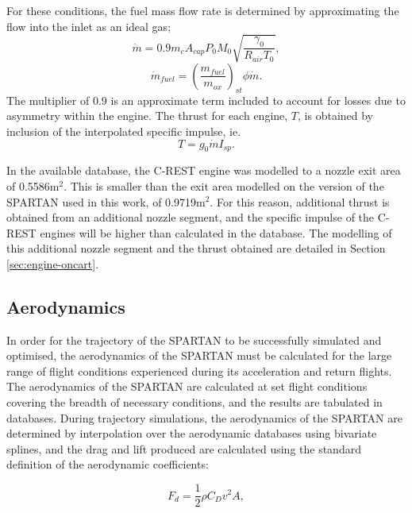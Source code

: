 For these conditions, the fuel mass flow rate is determined by approximating the flow into the inlet as an ideal gas; 
\begin{equation}
\dot{m} = 0.9 m_c A_{cap} P_0 M_0 \sqrt{\dfrac{\gamma_0}{R_{air} T_0}},
\end{equation}
\begin{equation}
\dot{m}_{fuel} = (\dfrac{m_{fuel}}{m_{ox}} )_{st} \phi \dot{m}.
\end{equation}
The multiplier of 0.9 is an approximate term included to account for losses due to asymmetry within the engine\cite{Preller2018a}. 
The thrust for each engine, $T$, is obtained by inclusion of the interpolated specific impulse, ie. 
\begin{equation}
T = g_0\dot{m}I_{sp}. 
\end{equation}

In the available database, the C-REST engine was modelled to a nozzle exit area of 0.5586m$^2$. This is smaller than the exit area modelled on the version of the SPARTAN used in this work, of 0.9719m$^2$. For this reason, additional thrust is obtained from an additional nozzle segment, and the specific impulse of the C-REST engines will be higher than calculated in the database. The modelling of this additional nozzle segment and the thrust obtained are detailed in Section \ref{sec:engine-oncart}.






		
		
		\subsection{Aerodynamics}\label{sec:aero}
		
		
		
In order for the trajectory of the SPARTAN to be successfully simulated and optimised, the aerodynamics of the SPARTAN must be calculated for the large range of flight conditions experienced during its acceleration and return flights. 
The aerodynamics of the SPARTAN are calculated at set flight conditions covering the breadth of necessary conditions, and the results are tabulated in databases. During trajectory simulations, the aerodynamics of the SPARTAN are determined by interpolation over the aerodynamic databases using bivariate splines, and the drag and lift produced are calculated using the standard definition of the aerodynamic coefficients:

\begin{equation}
F_d = \frac{1}{2}\rho C_D v^2 A ,
\end{equation}

